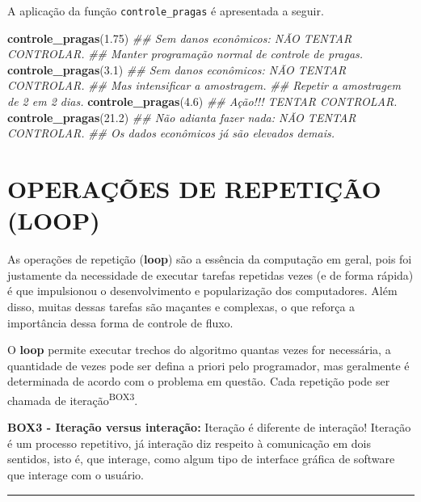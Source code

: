 \documentclass[
  11pt,
  a5paper,
  openany]{book}
\newenvironment{Shaded}{\begin{snugshade}}{\end{snugshade}}
\newcommand{\CommentTok}[1]{\textcolor[rgb]{0.56,0.35,0.01}{\textit{#1}}}
\newcommand{\FloatTok}[1]{\textcolor[rgb]{0.00,0.00,0.81}{#1}}
\newcommand{\KeywordTok}[1]{\textcolor[rgb]{0.13,0.29,0.53}{\textbf{#1}}}
\newcommand{\NormalTok}[1]{#1}
\begin{document}
A aplicação da função \texttt{controle\_pragas} é apresentada a seguir.

\begin{Shaded}
\begin{Highlighting}[]
\KeywordTok{controle_pragas}\NormalTok{(}\FloatTok{1.75}\NormalTok{)}
\CommentTok{## Sem danos econômicos: NÃO TENTAR CONTROLAR.}
\CommentTok{## Manter programação normal de controle de pragas.}
\KeywordTok{controle_pragas}\NormalTok{(}\FloatTok{3.1}\NormalTok{)}
\CommentTok{## Sem danos econômicos: NÃO TENTAR CONTROLAR.}
\CommentTok{## Mas intensificar a amostragem.}
\CommentTok{## Repetir a amostragem de 2 em 2 dias.}
\KeywordTok{controle_pragas}\NormalTok{(}\FloatTok{4.6}\NormalTok{)}
\CommentTok{## Ação!!! TENTAR CONTROLAR.}
\KeywordTok{controle_pragas}\NormalTok{(}\FloatTok{21.2}\NormalTok{)}
\CommentTok{## Não adianta fazer nada: NÃO TENTAR CONTROLAR.}
\CommentTok{## Os dados econômicos já são elevados demais.}
\end{Highlighting}
\end{Shaded}

\hypertarget{operauxe7uxf5es-de-repetiuxe7uxe3o-loop}{%
\chapter{OPERAÇÕES DE REPETIÇÃO (LOOP)}\label{operauxe7uxf5es-de-repetiuxe7uxe3o-loop}}

As operações de repetição (\textbf{loop}) são a essência da computação em geral, pois foi justamente da necessidade de executar tarefas repetidas vezes (e de forma rápida) é que impulsionou o desenvolvimento e popularização dos computadores. Além disso, muitas dessas tarefas são maçantes e complexas, o que reforça a importância dessa forma de controle de fluxo.

O \textbf{loop} permite executar trechos do algoritmo quantas vezes for necessária, a quantidade de vezes pode ser defina a priori pelo programador, mas geralmente é determinada de acordo com o problema em questão. Cada repetição pode ser chamada de iteração\textsuperscript{BOX3}.

\textbf{BOX3 - Iteração versus interação:}
Iteração é diferente de interação! Iteração é um processo repetitivo, já interação diz respeito à comunicação em dois sentidos, isto é, que interage, como algum tipo de interface gráfica de software que interage com o usuário.

\begin{center}\rule{0.5\linewidth}{0.5pt}\end{center}
\end{document}
